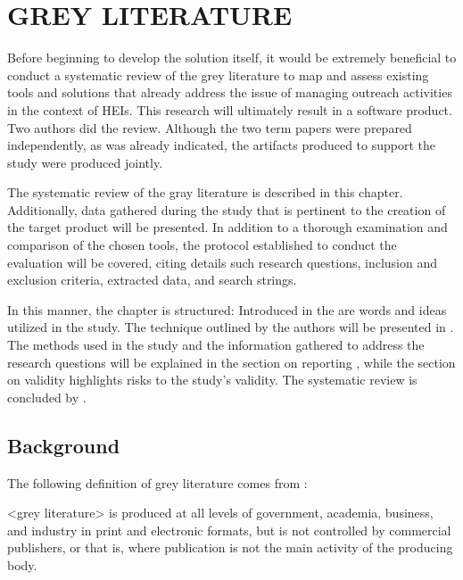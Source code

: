 \chapter{GREY LITERATURE}\label{grey_literature}

Before beginning to develop the solution itself, it would be extremely beneficial to conduct a systematic review of the grey literature to map and assess existing tools and solutions that already address the issue of managing outreach activities in the context of \acp{HEI}. This research will ultimately result in a software product. Two authors did the review. Although the two term papers were prepared independently, as was already indicated, the artifacts produced to support the study were produced jointly.

The systematic review of the gray literature is described in this chapter. Additionally, data gathered during the study that is pertinent to the creation of the target product will be presented. In addition to a thorough examination and comparison of the chosen tools, the protocol established to conduct the evaluation will be covered, citing details such research questions, inclusion and exclusion criteria, extracted data, and search strings.

In this manner, the chapter is structured: Introduced in the  are words and ideas utilized in the study. The technique outlined by the authors will be presented in . The methods used in the study and the information gathered to address the research questions will be explained in the section on reporting , while the section on validity  highlights risks to the study's validity. The systematic review is concluded by .

\section{Background}\label{sec:gl-background}

The following definition of grey literature comes from :
\begin{citacao}
  <grey literature> is produced at all levels of government, academia, business, and industry in print and electronic formats, but is not controlled by commercial publishers, or that is, where publication is not the main activity of the producing body.
\end{citacao}

